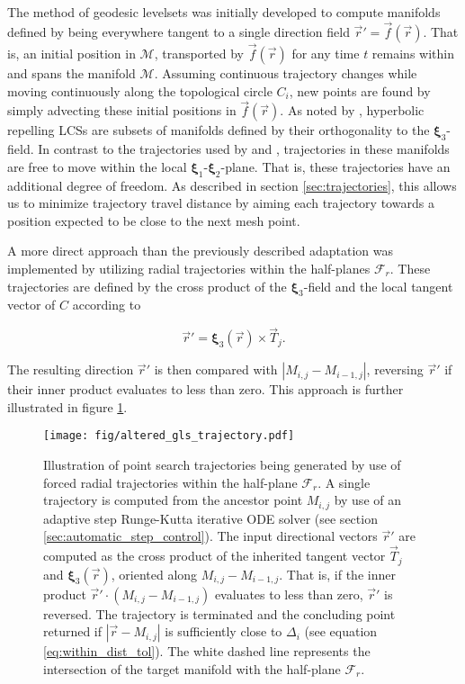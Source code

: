 The method of geodesic levelsets was initially developed to compute manifolds defined by being everywhere tangent to a single direction field $\vec{r}'=\vec{f}(\vec{r})$. That is, an initial position in $\mathcal{M}$, transported by $\vec{f}(\vec{r})$ for any time $t$ remains within and spans the manifold $\mathcal{M}$. Assuming continuous trajectory changes while moving continuously along the topological circle $C_i$, new points are found by simply advecting these initial positions in $\vec{f}(\vec{r})$. As noted by \cite{Oettinger}, hyperbolic repelling LCSs are subsets of manifolds defined by their orthogonality to the $\bm{\xi}_3$-field. In contrast to the trajectories used by \cite{GeodesicLevelSets} and \cite{Survey}, trajectories in these manifolds are free to move within the local $\bm{\xi}_1$-$\bm{\xi}_2$-plane. That is, these trajectories have an additional degree of freedom. As described in section \ref{sec:trajectories}, this allows us to minimize trajectory travel distance by aiming each trajectory towards a position expected to be close to the next mesh point.

A more direct approach than the previously described adaptation was implemented by utilizing radial trajectories within the half-planes $\mathcal{F}_r$. These trajectories are defined by the cross product of the $\bm{\xi}_3$-field and the local tangent vector of $C$ according to

\begin{equation}\label{eq:force_radially_outward}
\vec{r}' = \bm{\xi}_3(\vec{r}) \times \vec{T}_j.
\end{equation}

\noindent The resulting direction $\vec{r}'$ is then compared with $\left|M_{i,j}-M_{i-1,j}\right|$, reversing $\vec{r}'$ if their inner product evaluates to less than zero. This approach is further illustrated in figure \ref{fig:force_radially_outward}.

\begin{figure}[h!] 
\centering
\texttt{[image: fig/altered\_gls\_trajectory.pdf]}
\caption{Illustration of point search trajectories being generated by use of forced radial trajectories within the half-plane $\mathcal{F}_r$. A single trajectory is computed from the ancestor point $M_{i,j}$ by use of an adaptive step Runge-Kutta iterative ODE solver (see section \ref{sec:automatic_step_control}). The input directional vectors $\vec{r}'$ are computed as the cross product of the inherited tangent vector $\vec{T}_j$ and $\bm{\xi}_3(\vec{r})$, oriented along $M_{i,j}-M_{i-1,j}$. That is, if the inner product $\vec{r}'\cdot (M_{i,j}-M_{i-1,j})$ evaluates to less than zero, $\vec{r}'$ is reversed. The trajectory is terminated and the concluding point returned if $\left|\vec{r}-M_{i,j}\right|$ is sufficiently close to $\Delta_i$ (see equation \eqref{eq:within_dist_tol}). The white dashed line represents the intersection of the target manifold with the half-plane $\mathcal{F}_r$.}\label{fig:force_radially_outward}
\end{figure}


